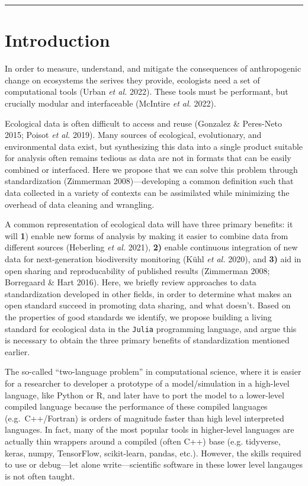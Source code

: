 \documentclass[10pt,oneside]{article}
\begin{document}
\begin{center}\rule{0.5\linewidth}{0.5pt}\end{center}

\hypertarget{introduction}{%
\section{Introduction}\label{introduction}}

In order to measure, understand, and mitigate the consequences of
anthropogenic change on ecosystems the serives they provide, ecologists
need a set of computational tools (Urban \emph{et al.} 2022). These
tools must be performant, but crucially modular and interfaceable
(McIntire \emph{et al.} 2022).

Ecological data is often difficult to access and reuse (Gonzalez \&
Peres-Neto 2015; Poisot \emph{et al.} 2019). Many sources of ecological,
evolutionary, and environmental data exist, but synthesizing this data
into a single product suitable for analysis often remains tedious as
data are not in formats that can be easily combined or interfaced. Here
we propose that we can solve this problem through standardization
(Zimmerman 2008)---developing a common definition such that data
collected in a variety of contexts can be assimilated while minimizing
the overhead of data cleaning and wrangling.

A common representation of ecological data will have three primary
benefits: it will \textbf{1}) enable new forms of analysis by making it
easier to combine data from different sources (Heberling \emph{et al.}
2021), \textbf{2)} enable continuous integration of new data for
next-generation biodiversity monitoring (Kühl \emph{et al.} 2020), and
\textbf{3)} aid in open sharing and reproducability of published results
(Zimmerman 2008; Borregaard \& Hart 2016). Here, we briefly review
approaches to data standardization developed in other fields, in order
to determine what makes an open standard succeed in promoting data
sharing, and what doesn't. Based on the properties of good standards we
identify, we propose building a living standard for ecological data in
the \texttt{Julia} programming language, and argue this is necessary to
obtain the three primary benefits of standardization mentioned earlier.

The so-called ``two-language problem'' in computational science, where
it is easier for a researcher to developer a prototype of a
model/simulation in a high-level language, like Python or R, and later
have to port the model to a lower-level compiled language because the
performance of these compiled languages (e.g.~C++/Fortran) is orders of
magnitude faster than high level interpreted languages. In fact, many of
the most popular tools in higher-level languages are actually thin
wrappers around a compiled (often C++) base (e.g. tidyverse, keras,
numpy, TensorFlow, scikit-learn, pandas, etc.). However, the skills
required to use or debug---let alone write---scientific software in
these lower level langauges is not often taught.
\end{document}

